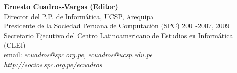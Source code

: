 \begin{center}
\textbf{Ernesto Cuadros-Vargas (Editor)}\\
Director del P.P. de Informática, UCSP, Arequipa\\ %
Presidente de la Sociedad Peruana de Computación (SPC) 2001-2007, 2009\\
Secretario Ejecutivo del Centro Latinoamericano de Estudios en Informática (CLEI)\\
email: \textit{ecuadros@spc.org.pe, ecuadros@ucsp.edu.pe}\\
\textit{http://socios.spc.org.pe/ecuadros}
\end{center}


